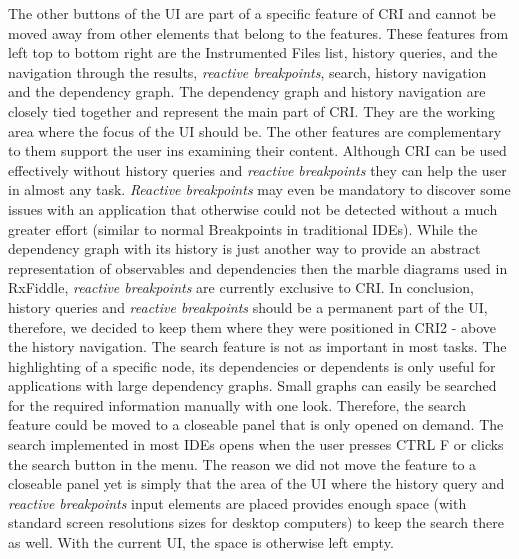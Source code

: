 The other buttons of the UI are part of a specific feature of CRI and cannot be moved away from other elements that belong to the features. These features from left top to bottom right are the Instrumented Files list, history queries, and the navigation through the results, \emph{reactive breakpoints}, search, history navigation and the dependency graph. The dependency graph and history navigation are closely tied together and represent the main part of CRI. They are the working area where the focus of the UI should be. The other features are complementary to them support the user ins examining their content. Although CRI can be used effectively without history queries and \emph{reactive breakpoints} they can help the user in almost any task. \emph{Reactive breakpoints} may even be mandatory to discover some issues with an application that otherwise could not be detected without a much greater effort (similar to normal Breakpoints in traditional IDEs). While the dependency graph with its history is just another way to provide an abstract representation of observables and dependencies then the marble diagrams used in RxFiddle, \emph{reactive breakpoints} are currently exclusive to CRI. In conclusion, history queries and \emph{reactive breakpoints} should be a permanent part of the UI, therefore, we decided to keep them where they were positioned in CRI2 - above the history navigation. The search feature is not as important in most tasks. The highlighting of a specific node, its dependencies or dependents is only useful for applications with large dependency graphs. Small graphs can easily be searched for the required information manually with one look. Therefore, the search feature could be moved to a closeable panel that is only opened on demand. The search implemented in most IDEs opens when the user presses CTRL F or clicks the search button in the menu. The reason we did not move the feature to a closeable panel yet is simply that the area of the UI where the history query and \emph{reactive breakpoints} input elements are placed provides enough space (with standard screen resolutions sizes for desktop computers) to keep the search there as well. With the current UI, the space is otherwise left empty. %
